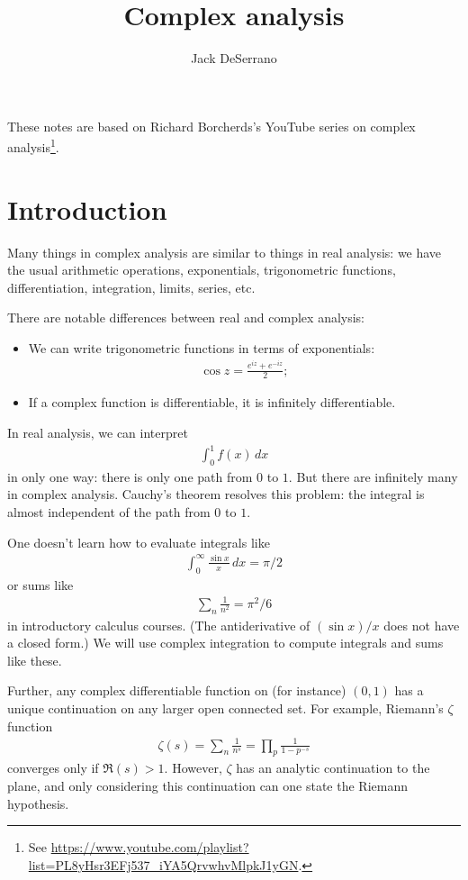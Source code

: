 \documentclass[11pt, oneside,margin=1in]{article}
\title{Complex analysis}
\author{Jack DeSerrano}
\begin{document}
\ifams
    \vspace*{\fill}
\fi
\maketitle
These notes are based on Richard Borcherds's YouTube series on complex analysis\footnote{See \url{https://www.youtube.com/playlist?list=PL8yHsr3EFj537_iYA5QrvwhvMlpkJ1yGN}.}.
\ifams
	\vspace*{\fill}
\fi
\newpage
\section{Introduction}
Many things in complex analysis are similar to things in real analysis: we have the usual arithmetic operations, exponentials, trigonometric functions, differentiation, integration, limits, series, etc.

There are notable differences between real and complex analysis:
\begin{itemize}
	\item We can write trigonometric functions in terms of exponentials:
		\begin{align*}
			\cos z = \frac{e^{iz} + e^{-iz}}{2};
		\end{align*}
	\item If a complex function is differentiable, it is infinitely differentiable.
\end{itemize}

In real analysis, we can interpret
\begin{align*}
	\int_{0}^{1} f(x)   \, dx
\end{align*}
in only one way: there is only one path from $0$ to $1$. But there are infinitely many in complex analysis. Cauchy's theorem resolves this problem: the integral is almost independent of the path from $0$ to $1$.

One doesn't learn how to evaluate integrals like
\begin{align*}
	\int_{0}^{\infty} \frac{\sin x}{x}  \, dx = \pi/2
\end{align*}
or sums like
\begin{align*}
	\sum_n \frac{1}{n^2} = \pi^2/6
\end{align*}
in introductory calculus courses. (The antiderivative of $(\sin x)/x$ does not have a closed form.) We will use complex integration to compute integrals and sums like these.

Further, any complex differentiable function on (for instance) $(0,1)$ has a unique continuation on any larger open connected set. For example, Riemann's $\zeta$ function
 \begin{align*}
	\zeta (s)= \sum_n  \frac{1}{n^s}= \prod_{p} \frac{1}{1-p^{-s}}
\end{align*}
converges only if $\Re(s) > 1$. However, $\zeta$ has an analytic continuation to the plane, and only considering this continuation can one state the Riemann hypothesis. 
\end{document}

